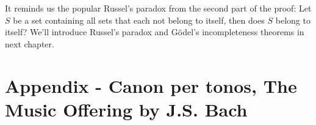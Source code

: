 \documentclass{article}
\begin{document}
It reminds us the popular Russel's paradox from the second part of the proof: Let $S$ be a set containing all sets that each not belong to itself, then does $S$ belong to itself? We'll introduce Russel's paradox and Gödel's incompleteness theorems in next chapter.


\section{Appendix - Canon per tonos, The Music Offering by J.S. Bach}


\end{document}
